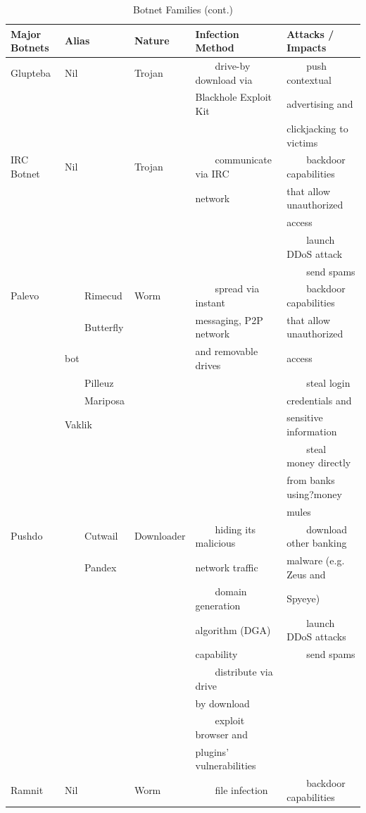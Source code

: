 \documentclass[12pt]{article}
\newcommand{\tabitem}{~~\llap{\textbullet}~~}
\begin{document}
\newpage\begin{table}[!htbp]
\centering
\caption{Botnet Families (cont.)}
\begin{tabular}{lllll} \hline
\bf Major Botnets & \bf Alias & \bf Nature & \bf Infection Method & \bf Attacks / Impacts\\\hline
Glupteba &Nil &Trojan &\tabitem drive-by download via &\tabitem push contextual \\
&&&Blackhole Exploit Kit &advertising and \\
&&&&clickjacking to victims \\
IRC Botnet &Nil   &Trojan   &\tabitem communicate via IRC &\tabitem backdoor capabilities \\
&&&network   &that allow unauthorized \\
&&&&access \\
&&&&\tabitem launch DDoS attack \\
&&&&\tabitem send spams \\
Palevo &\tabitem Rimecud &Worm     &\tabitem spread via instant &\tabitem backdoor capabilities \\
&\tabitem Butterfly &&messaging, P2P network &that allow unauthorized \\
&bot &&and removable drives     &access \\
&\tabitem Pilleuz &&&\tabitem steal login \\
&\tabitem Mariposa &&&credentials and \\
&Vaklik &&&sensitive information \\
&&&&\tabitem steal money directly \\
&&&&from banks using?money \\
&&&&mules   \\
Pushdo &\tabitem Cutwail &Downloader    &\tabitem hiding its malicious &\tabitem download other banking \\
&\tabitem Pandex   &&network traffic &malware (e.g. Zeus and \\
&&&\tabitem domain generation &Spyeye) \\
&&&algorithm (DGA) &\tabitem launch DDoS attacks \\
&&&capability &\tabitem send spams  \\
&&&\tabitem distribute via drive &\\
&&&by download &\\
&&&\tabitem exploit browser and &\\
&&&plugins' vulnerabilities &\\
Ramnit &Nil   &Worm   &\tabitem file infection &\tabitem backdoor capabilities \\

\end{tabular}
\end{table}
\end{document}
